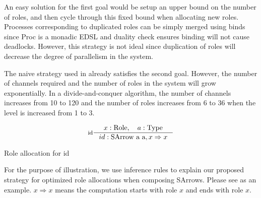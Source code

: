 An easy solution for the first goal would be setup an upper bound on the number of roles, and then cycle through this fixed bound when allocating new roles. Processes corresponding to duplicated roles can be simply merged using binds since Proc is a monadic EDSL and duality check ensures binding will not cause deadlocks. However, this strategy is not ideal since duplication of roles will decrease the degree of parallelism in the system.

The naive strategy used in  already satisfies the second goal. However, the number of channels required and the number of roles in the system will grow exponentially. In a divide-and-conquer algorithm, the number of channels increases from 10 to 120 and the number of roles increases from 6 to 36 when the level is increased from 1 to 3.

\begin{table}[ht]
\begin{displaymath} 
    \inference[id]{x: \text{Role}, \quad a: \text{Type}}{id : \text{SArrow a a}, x \Rightarrow x}
\end{displaymath}
\caption{Role allocation for id}
\label{SArrow:ra:example}
\end{table}

For the purpose of illustration, we use inference rules to explain our proposed strategy for optimized role allocations when composing SArrows. Please see  as an example. $x \Rightarrow x$ means the computation starts with role $x$ and ends with role $x$.

